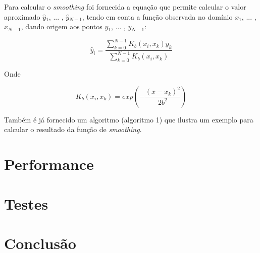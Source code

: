 \documentclass[a4paper]{article}
\begin{document}
	Para calcular o \textit{smoothing} foi fornecida a equação que permite calcular o valor aproximado $\hat{y}$$ _1$, $...$ , $\hat{y}$$ _{N-1}$, tendo em conta a função observada no domínio $x$$ _1$, $...$ , $x$$ _{N-1}$, dando origem aos pontos $y$$ _1$, $...$ , $y$$ _{N-1}$:
	
	\begin{equation}
		\hat{y}_i =  \frac{ \sum_{k=0}^{N-1} K_b (x_i, x_k ) y_k}{\sum_{k=0}^{N-1} K_b (x_i, x_k )} 
		\label{eq:smoothing_function}
	\end{equation}
	
	Onde
	
	\begin{equation}
		K_b (x_i,x_k)=exp\left(-\frac{(x-x_k)^2}{2b^2} \right)
		\label{eq:smoothing_kb}
	\end{equation}
	 	
	 	 
	Também é já fornecido um algoritmo (algoritmo 1) que ilustra um exemplo para calcular o resultado da função de \textit{smoothing}.
	
	
	\section{Performance}
	
	\section{Testes} 
		
	\section{Conclusão}
\end{document}
